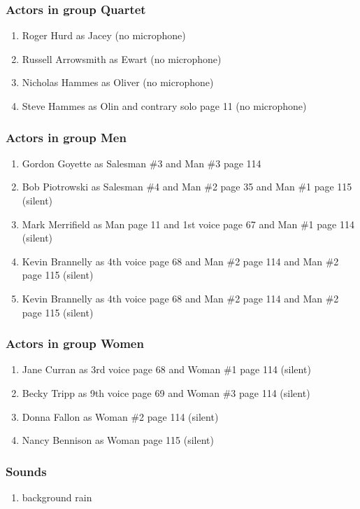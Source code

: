 \subsubsection{Actors in group Quartet}
\begin{enumerate}
\item Roger Hurd as Jacey (no microphone)
\item Russell Arrowsmith as Ewart (no microphone)
\item Nicholas Hammes as Oliver (no microphone)
\item Steve Hammes as Olin and contrary solo page 11 (no microphone)
\end{enumerate}
\subsubsection{Actors in group Men}
\begin{enumerate}
\item Gordon Goyette as Salesman \#3 and Man \#3 page 114
\item Bob Piotrowski as Salesman \#4 and Man \#2 page 35 and Man \#1 page 115 (silent)
\item Mark Merrifield as Man page 11 and 1st voice page 67 and Man \#1 page 114 (silent)
\item Kevin Brannelly as 4th voice page 68 and Man \#2 page 114 and Man \#2 page 115 (silent)
\item Kevin Brannelly as 4th voice page 68 and Man \#2 page 114 and Man \#2 page 115 (silent)
\end{enumerate}
\subsubsection{Actors in group Women}
\begin{enumerate}
\item Jane Curran as 3rd voice page 68 and Woman \#1 page 114 (silent)
\item Becky Tripp as 9th voice page 69 and Woman \#3 page 114 (silent)
\item Donna Fallon as Woman \#2 page 114 (silent)
\item Nancy Bennison as Woman page 115 (silent)
\end{enumerate}

\subsubsection{Sounds}
\begin{enumerate}
\item background rain
\end{enumerate}
